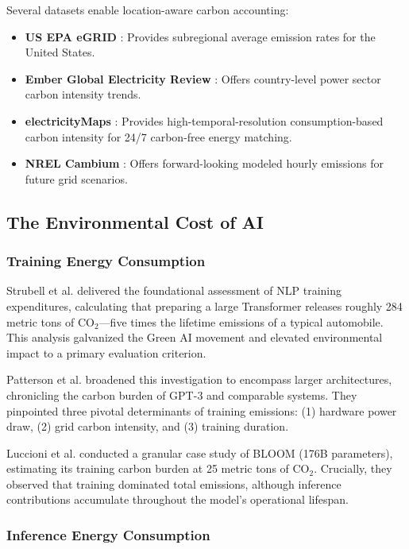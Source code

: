 \documentclass[11pt]{article}
\begin{document}
Several datasets enable location-aware carbon accounting:
\begin{itemize}
    \item \textbf{US EPA eGRID} \cite{epa2025egrid}: Provides subregional average emission rates for the United States.
    \item \textbf{Ember Global Electricity Review} \cite{ember2025review}: Offers country-level power sector carbon intensity trends.
    \item \textbf{electricityMaps} \cite{electricitymaps2025}: Provides high-temporal-resolution consumption-based carbon intensity for 24/7 carbon-free energy matching.
    \item \textbf{NREL Cambium} \cite{nrel2024cambium}: Offers forward-looking modeled hourly emissions for future grid scenarios.
\end{itemize}

\subsection{The Environmental Cost of AI}

\subsubsection{Training Energy Consumption}

Strubell et al. \cite{strubell2019energy} delivered the foundational assessment of NLP training expenditures, calculating that preparing a large Transformer releases roughly 284 metric tons of CO$_2$---five times the lifetime emissions of a typical automobile. This analysis galvanized the Green AI movement and elevated environmental impact to a primary evaluation criterion.

Patterson et al. \cite{patterson2021carbon} broadened this investigation to encompass larger architectures, chronicling the carbon burden of GPT-3 and comparable systems. They pinpointed three pivotal determinants of training emissions: (1) hardware power draw, (2) grid carbon intensity, and (3) training duration.

Luccioni et al. \cite{luccioni2022estimating} conducted a granular case study of BLOOM (176B parameters), estimating its training carbon burden at 25 metric tons of CO$_2$. Crucially, they observed that training dominated total emissions, although inference contributions accumulate throughout the model's operational lifespan.

\subsubsection{Inference Energy Consumption}
\end{document}
